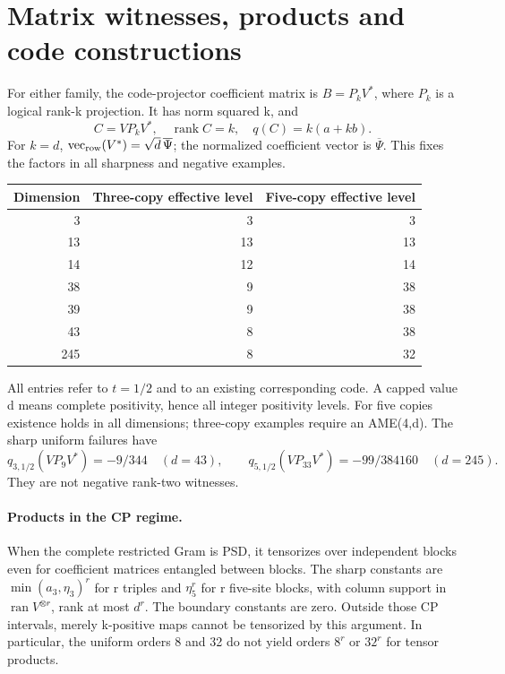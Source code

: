 \documentclass[11pt,a4paper]{article}
\newcommand{\ran}{\operatorname{ran}}
\DeclareMathOperator{\rank}{rank}
\begin{document}
\section{Matrix witnesses, products and code constructions}\label{sec:codes}
For either family, the code-projector coefficient matrix is \(B=P_kV^*\), where \(P_k\) is a logical rank-k projection. It has norm squared k, and
\[
 C=VP_kV^*,\quad \rank C=k,\quad
 q(C)=k(a+kb).
\]
For \(k=d\), \(\mathrm{vec}_{\rm row}(V^*)=\sqrt d\,\overline\Psi\); the normalized coefficient vector is \(\overline\Psi\). This fixes the factors in all sharpness and negative examples.

\begin{center}
\begin{tabular}{rrr}
\toprule
Dimension & Three-copy effective level & Five-copy effective level\\
\midrule
3&3&3\\
13&13&13\\
14&12&14\\
38&9&38\\
39&9&38\\
43&8&38\\
245&8&32\\
\bottomrule
\end{tabular}
\end{center}
All entries refer to \(t=1/2\) and to an existing corresponding code. A capped value d means complete positivity, hence all integer positivity levels. For five copies existence holds in all dimensions; three-copy examples require an AME(4,d). The sharp uniform failures have
\[
 q_{3,1/2}(VP_9V^*)=-9/344\quad(d=43),\qquad
 q_{5,1/2}(VP_{33}V^*)=-99/384160\quad(d=245).
\]
They are not negative rank-two witnesses.

\paragraph{Products in the CP regime.}
When the complete restricted Gram is PSD, it tensorizes over independent blocks even for coefficient matrices entangled between blocks. The sharp constants are \(\min(a_3,\eta_3)^r\) for r triples and \(\eta_5^r\) for r five-site blocks, with column support in \(\ran V^{\otimes r}\), rank at most \(d^r\). The boundary constants are zero. Outside those CP intervals, merely k-positive maps cannot be tensorized by this argument. In particular, the uniform orders 8 and 32 do not yield orders \(8^r\) or \(32^r\) for tensor products.
\end{document}
